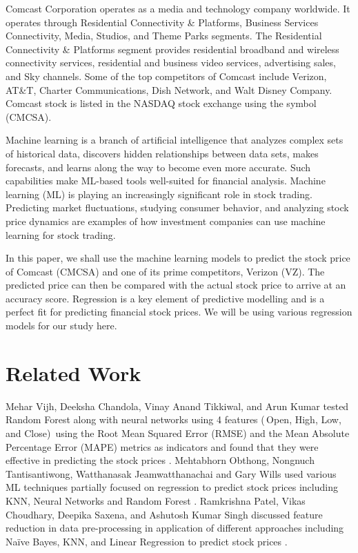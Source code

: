 \documentclass[conference]{IEEEtran}
\begin{document}
Comcast Corporation operates as a media and technology company worldwide.
It operates through Residential Connectivity \& Platforms, Business Services Connectivity, Media, Studios, and Theme Parks segments.
The Residential Connectivity \& Platforms segment provides residential broadband and wireless connectivity services, residential and business video services, advertising sales, and Sky channels. Some of the top competitors of Comcast include Verizon, AT\&T, Charter Communications, Dish Network, and Walt Disney Company.
Comcast stock is listed in the NASDAQ stock exchange using the symbol (CMCSA).\par
Machine learning is a branch of artificial intelligence that analyzes complex sets of historical data, discovers hidden relationships between data sets, makes forecasts, and learns along the way to become even more accurate.
Such capabilities make ML-based tools well-suited for financial analysis.
Machine learning (ML) is playing an increasingly significant role in stock trading.
Predicting market fluctuations, studying consumer behavior, and analyzing stock price dynamics are examples of how investment companies can use machine learning for stock trading.\par
In this paper, we shall use the machine learning models to predict the stock price of Comcast (CMCSA) and one of its prime competitors, Verizon (VZ).
The predicted price can then be compared with the actual stock price to arrive at an accuracy score. Regression is a key element of predictive modelling and is a perfect fit for predicting financial stock prices.
We will be using various regression models for our study here.

\section{Related Work}

Mehar Vijh, Deeksha Chandola, Vinay Anand Tikkiwal, and Arun Kumar tested Random Forest along with neural networks using 4 features (\,Open, High, Low, and Close)\, using the Root Mean Squared Error (RMSE) and the Mean Absolute Percentage Error (MAPE) metrics as indicators and found that they were effective in predicting the stock prices \cite{b3}.
Mehtabhorn Obthong, Nongnuch Tantisantiwong, Watthanasak Jeamwatthanachai and Gary Wills used various ML techniques partially focused on regression to predict stock prices including KNN, Neural Networks and Random Forest \cite{b4}.
Ramkrishna Patel, Vikas Choudhary, Deepika Saxena, and Ashutosh Kumar Singh discussed feature reduction in data pre-processing in application of different approaches including Naïve Bayes, KNN, and Linear Regression to predict stock prices \cite{b5}.
\end{document}
